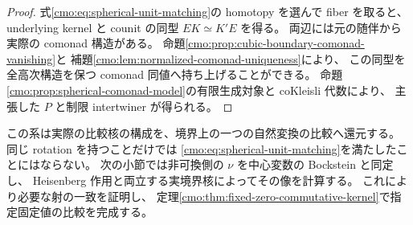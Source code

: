 \begin{proof}
式\eqref{cmo:eq:spherical-unit-matching}の homotopy を選んで fiber を取ると、
underlying kernel と counit の同型 $E K\simeq K'E$ を得る。
両辺には元の随伴から実際の comonad 構造がある。
命題\ref{cmo:prop:cubic-boundary-comonad-vanishing}と
補題\ref{cmo:lem:normalized-comonad-uniqueness}により、
この同型を全高次構造を保つ comonad 同値へ持ち上げることができる。
命題\ref{cmo:prop:spherical-comonad-model}の有限生成対象と coKleisli 代数により、
主張した $P$ と制限 intertwiner が得られる。
\end{proof}

この系は実際の比較核の構成を、境界上の一つの自然変換の比較へ還元する。
同じ rotation を持つことだけでは
\eqref{cmo:eq:spherical-unit-matching}を満たしたことにはならない。
次の小節では非可換側の $\nu$ を中心変数の Bockstein と同定し、
Heisenberg 作用と両立する実境界核によってその像を計算する。
これにより必要な射の一致を証明し、
定理\ref{cmo:thm:fixed-zero-commutative-kernel}で指定固定値の比較を完成する。
